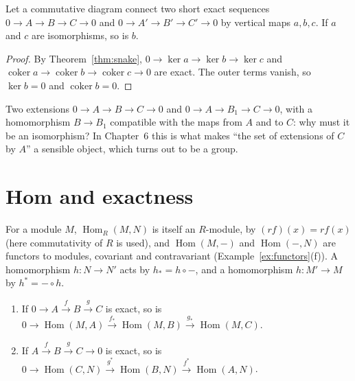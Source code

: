 \begin{corollary}\label{cor:fivelemma}
Let a commutative diagram connect two short exact sequences $0\to A\to B\to C\to0$ and $0\to A'\to B'\to C'\to0$ by vertical maps $a,b,c$. If $a$ and $c$ are isomorphisms, so is $b$.
\end{corollary}

\begin{proof}
By Theorem~\ref{thm:snake}, $0\to\ker a\to\ker b\to\ker c$ and $\operatorname{coker}a\to\operatorname{coker}b\to\operatorname{coker}c\to0$ are exact. The outer terms vanish, so $\ker b=0$ and $\operatorname{coker}b=0$.
\end{proof}

\begin{think}
Two extensions $0\to A\to B\to C\to0$ and $0\to A\to B_1\to C\to0$, with a homomorphism $B\to B_1$ compatible with the maps from $A$ and to $C$: why must it be an isomorphism? In Chapter~6 this is what makes
``the set of extensions of $C$ by $A$'' a sensible object, which turns out to be a group.
\end{think}

\section{Hom and exactness}

For a module $M$, $\operatorname{Hom}_R(M,N)$ is itself an $R$-module, by $(rf)(x)=rf(x)$ (here commutativity of $R$ is used), and $\operatorname{Hom}(M,-)$ and $\operatorname{Hom}(-,N)$ are functors to modules, covariant and contravariant
(Example~\ref{ex:functors}(f)). A homomorphism $h\colon N\to N'$ acts by $h_*=h\circ-$, and a homomorphism $h\colon M'\to M$ by $h^*=-\circ h$.

\begin{proposition}\label{prop:homleft}
\leavevmode
\begin{enumerate}[label=(\alph*)]
\item If $0\to A\xrightarrow fB\xrightarrow gC$ is exact, so is $0\to\operatorname{Hom}(M,A)\xrightarrow{f_*}\operatorname{Hom}(M,B)\xrightarrow{g_*}\operatorname{Hom}(M,C)$.
\item If $A\xrightarrow fB\xrightarrow gC\to0$ is exact, so is $0\to\operatorname{Hom}(C,N)\xrightarrow{g^*}\operatorname{Hom}(B,N)\xrightarrow{f^*}\operatorname{Hom}(A,N)$.
\end{enumerate}
\end{proposition}


